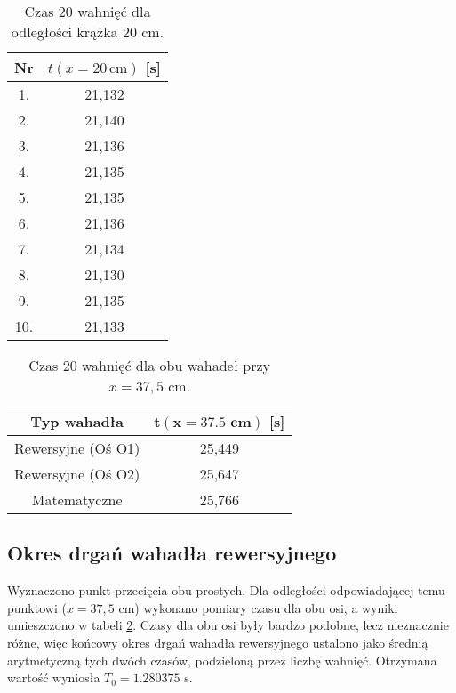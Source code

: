 \documentclass[a4paper,12pt]{article}
\begin{document}
\begin{table}[H] 
    \centering
    \begin{tabular}{|c|c|}
        \toprule
        Nr & $t(x=20\,\text{cm})$ [s] \\
        \midrule
        1.  & 21,132 \\
          \hline
        2.  & 21,140  \\
          \hline
        3. & 21,136 \\
          \hline
        4. & 21,135 \\
          \hline
        5. & 21,135 \\
          \hline
        6. & 21,136 \\
          \hline
        7. & 21,134 \\
          \hline
        8. & 21,130 \\
          \hline
        9. & 21,135 \\
          \hline
        10. & 21,133 \\
        \bottomrule
    \end{tabular}
    \caption{Czas 20 wahnięć dla odległości krążka 20 cm.}
    \label{tab:last_column}
\end{table}

\begin{table}[h]
    \centering
    \begin{tabular}{|c|c|}
        \hline
        \textbf{Typ wahadła} & \textbf{$\mathbf{t(x=37.5\text{ cm})}$ [s]} \\ 
        \hline
        Rewersyjne (Oś O1) & 25,449 \\
        \hline
        Rewersyjne (Oś O2) & 25,647 \\
        \hline
        Matematyczne & 25,766 \\ 
        \hline
    \end{tabular}
    \caption{Czas 20 wahnięć dla obu wahadeł przy $x=37,5$ cm.}
    \label{tab:czasy}
\end{table}
\newpage

\subsection{Okres drgań wahadła rewersyjnego}

Wyznaczono punkt przecięcia obu prostych. Dla odległości odpowiadającej temu punktowi ($x=37,5$ cm) wykonano pomiary czasu dla obu osi, a wyniki umieszczono w tabeli \ref{tab:czasy}. Czasy dla obu osi były bardzo podobne, lecz nieznacznie różne, więc końcowy okres drgań wahadła rewersyjnego ustalono jako średnią arytmetyczną tych dwóch czasów, podzieloną przez liczbę wahnięć. Otrzymana wartość wyniosła $T_0 = 1.280375$ s.
\end{document}
